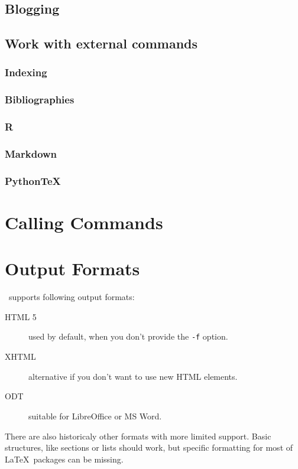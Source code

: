 \documentclass{book}
\begin{document}


\section{Blogging}

\section{Work with external commands}
\subsection{Indexing}
\subsection{Bibliographies}
\subsection{R}
\subsection{Markdown}
\subsection{PythonTeX}


\chapter{Calling Commands}

\label{sec:calling-commands}
\chapter{Output Formats}
\label{sec:output-formats}

\texfourht\ supports following output formats:

\begin{description}
  \item[HTML 5] used by default, when you don't provide the \texttt{-f} option.
  \item[XHTML]  alternative if you don't want to use new HTML elements.
  \item[ODT]    suitable for LibreOffice or MS Word.
\end{description}

There are also historicaly other formats with more limited support. Basic structures,
like sections or lists should work, but specific formatting for most of \LaTeX\ packages 
can be missing.
\end{document}
